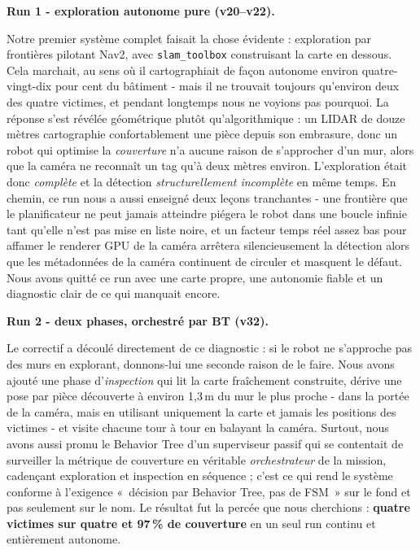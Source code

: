\documentclass[11pt,a4paper]{article}
\newcommand{\head}[1]{\par\smallskip\noindent\textbf{\color{nccblue}#1}\par}
\begin{document}
\head{Run 1 - exploration autonome pure (v20--v22).} Notre premier système complet faisait la chose
évidente : exploration par frontières pilotant Nav2, avec \texttt{slam\_toolbox} construisant la carte
en dessous. Cela marchait, au sens où il cartographiait de façon autonome environ quatre-vingt-dix pour
cent du bâtiment - mais il ne trouvait toujours qu'environ deux des quatre victimes, et pendant longtemps
nous ne voyions pas pourquoi. La réponse s'est révélée géométrique plutôt qu'algorithmique : un LIDAR de
douze mètres cartographie confortablement une pièce depuis son embrasure, donc un robot qui optimise la
\emph{couverture} n'a aucune raison de s'approcher d'un mur, alors que la caméra ne reconnaît un tag qu'à
deux mètres environ. L'exploration était donc \emph{complète} et la détection \emph{structurellement
incomplète} en même temps. En chemin, ce run nous a aussi enseigné deux leçons tranchantes - une frontière
que le planificateur ne peut jamais atteindre piégera le robot dans une boucle infinie tant qu'elle n'est
pas mise en liste noire, et un facteur temps réel assez bas pour affamer le renderer GPU de la caméra
arrêtera silencieusement la détection alors que les métadonnées de la caméra continuent de circuler et
masquent le défaut. Nous avons quitté ce run avec une carte propre, une autonomie fiable et un diagnostic
clair de ce qui manquait encore.

\head{Run 2 - deux phases, orchestré par BT (v32).} Le correctif a découlé directement de ce diagnostic :
si le robot ne s'approche pas des murs en explorant, donnons-lui une seconde raison de le faire. Nous
avons ajouté une phase d'\emph{inspection} qui lit la carte fraîchement construite, dérive une pose par
pièce découverte à environ 1,3\,m du mur le plus proche - dans la portée de la caméra, mais en utilisant
uniquement la carte et jamais les positions des victimes - et visite chacune tour à tour en balayant la
caméra. Surtout, nous avons aussi promu le Behavior Tree d'un superviseur passif qui se contentait de
surveiller la métrique de couverture en véritable \emph{orchestrateur} de la mission, cadençant
exploration et inspection en séquence ; c'est ce qui rend le système conforme à l'exigence «~décision par
Behavior Tree, pas de FSM~» sur le fond et pas seulement sur le nom. Le résultat fut la percée que nous
cherchions : \textbf{quatre victimes sur quatre et 97\,\% de couverture} en un seul run continu et
entièrement autonome.
\end{document}

